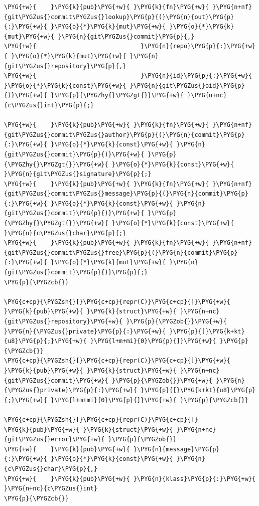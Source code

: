 \begin{Verbatim}[commandchars=\\\{\},breaklines=true,breakanywhere=true,fontsize=\codefont,xleftmargin=17bp]
\PYG{+w}{    }\PYG{k}{pub}\PYG{+w}{ }\PYG{k}{fn}\PYG{+w}{ }\PYG{n+nf}{git\PYGZus{}commit\PYGZus{}lookup}\PYG{p}{(}\PYG{n}{out}\PYG{p}{:}\PYG{+w}{ }\PYG{o}{*}\PYG{k}{mut}\PYG{+w}{ }\PYG{o}{*}\PYG{k}{mut}\PYG{+w}{ }\PYG{n}{git\PYGZus{}commit}\PYG{p}{,}
\PYG{+w}{                             }\PYG{n}{repo}\PYG{p}{:}\PYG{+w}{ }\PYG{o}{*}\PYG{k}{mut}\PYG{+w}{ }\PYG{n}{git\PYGZus{}repository}\PYG{p}{,}
\PYG{+w}{                             }\PYG{n}{id}\PYG{p}{:}\PYG{+w}{ }\PYG{o}{*}\PYG{k}{const}\PYG{+w}{ }\PYG{n}{git\PYGZus{}oid}\PYG{p}{)}\PYG{+w}{ }\PYG{p}{\PYGZhy{}\PYGZgt{}}\PYG{+w}{ }\PYG{n+nc}{c\PYGZus{}int}\PYG{p}{;}

\PYG{+w}{    }\PYG{k}{pub}\PYG{+w}{ }\PYG{k}{fn}\PYG{+w}{ }\PYG{n+nf}{git\PYGZus{}commit\PYGZus{}author}\PYG{p}{(}\PYG{n}{commit}\PYG{p}{:}\PYG{+w}{ }\PYG{o}{*}\PYG{k}{const}\PYG{+w}{ }\PYG{n}{git\PYGZus{}commit}\PYG{p}{)}\PYG{+w}{ }\PYG{p}{\PYGZhy{}\PYGZgt{}}\PYG{+w}{ }\PYG{o}{*}\PYG{k}{const}\PYG{+w}{ }\PYG{n}{git\PYGZus{}signature}\PYG{p}{;}
\PYG{+w}{    }\PYG{k}{pub}\PYG{+w}{ }\PYG{k}{fn}\PYG{+w}{ }\PYG{n+nf}{git\PYGZus{}commit\PYGZus{}message}\PYG{p}{(}\PYG{n}{commit}\PYG{p}{:}\PYG{+w}{ }\PYG{o}{*}\PYG{k}{const}\PYG{+w}{ }\PYG{n}{git\PYGZus{}commit}\PYG{p}{)}\PYG{+w}{ }\PYG{p}{\PYGZhy{}\PYGZgt{}}\PYG{+w}{ }\PYG{o}{*}\PYG{k}{const}\PYG{+w}{ }\PYG{n}{c\PYGZus{}char}\PYG{p}{;}
\PYG{+w}{    }\PYG{k}{pub}\PYG{+w}{ }\PYG{k}{fn}\PYG{+w}{ }\PYG{n+nf}{git\PYGZus{}commit\PYGZus{}free}\PYG{p}{(}\PYG{n}{commit}\PYG{p}{:}\PYG{+w}{ }\PYG{o}{*}\PYG{k}{mut}\PYG{+w}{ }\PYG{n}{git\PYGZus{}commit}\PYG{p}{)}\PYG{p}{;}
\PYG{p}{\PYGZcb{}}

\PYG{c+cp}{\PYGZsh{}[}\PYG{c+cp}{repr(C)}\PYG{c+cp}{]}\PYG{+w}{ }\PYG{k}{pub}\PYG{+w}{ }\PYG{k}{struct}\PYG{+w}{ }\PYG{n+nc}{git\PYGZus{}repository}\PYG{+w}{ }\PYG{p}{\PYGZob{}}\PYG{+w}{ }\PYG{n}{\PYGZus{}private}\PYG{p}{:}\PYG{+w}{ }\PYG{p}{[}\PYG{k+kt}{u8}\PYG{p}{;}\PYG{+w}{ }\PYG{l+m+mi}{0}\PYG{p}{]}\PYG{+w}{ }\PYG{p}{\PYGZcb{}}
\PYG{c+cp}{\PYGZsh{}[}\PYG{c+cp}{repr(C)}\PYG{c+cp}{]}\PYG{+w}{ }\PYG{k}{pub}\PYG{+w}{ }\PYG{k}{struct}\PYG{+w}{ }\PYG{n+nc}{git\PYGZus{}commit}\PYG{+w}{ }\PYG{p}{\PYGZob{}}\PYG{+w}{ }\PYG{n}{\PYGZus{}private}\PYG{p}{:}\PYG{+w}{ }\PYG{p}{[}\PYG{k+kt}{u8}\PYG{p}{;}\PYG{+w}{ }\PYG{l+m+mi}{0}\PYG{p}{]}\PYG{+w}{ }\PYG{p}{\PYGZcb{}}

\PYG{c+cp}{\PYGZsh{}[}\PYG{c+cp}{repr(C)}\PYG{c+cp}{]}
\PYG{k}{pub}\PYG{+w}{ }\PYG{k}{struct}\PYG{+w}{ }\PYG{n+nc}{git\PYGZus{}error}\PYG{+w}{ }\PYG{p}{\PYGZob{}}
\PYG{+w}{    }\PYG{k}{pub}\PYG{+w}{ }\PYG{n}{message}\PYG{p}{:}\PYG{+w}{ }\PYG{o}{*}\PYG{k}{const}\PYG{+w}{ }\PYG{n}{c\PYGZus{}char}\PYG{p}{,}
\PYG{+w}{    }\PYG{k}{pub}\PYG{+w}{ }\PYG{n}{klass}\PYG{p}{:}\PYG{+w}{ }\PYG{n+nc}{c\PYGZus{}int}
\PYG{p}{\PYGZcb{}}


\end{Verbatim}
